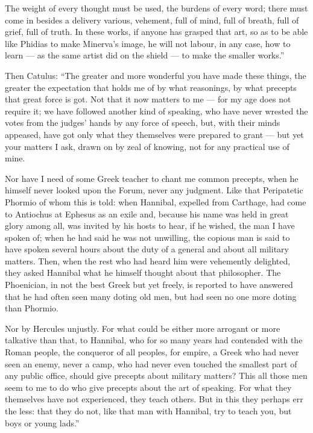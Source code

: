  The weight of every thought must be used, the burdens of every word; there must come in besides a delivery various, vehement, full of mind, full of breath, full of grief, full of truth. In these works, if anyone has grasped that art, so as to be able like Phidias to make Minerva's image, he will not labour, in any case, how to learn — as the same artist did on the shield — to make the smaller works.''

 Then Catulus: ``The greater and more wonderful you have made these things, the greater the expectation that holds me of by what reasonings, by what precepts that great force is got. Not that it now matters to me — for my age does not require it; we have followed another kind of speaking, who have never wrested the votes from the judges' hands by any force of speech, but, with their minds appeased, have got only what they themselves were prepared to grant — but yet your matters I ask, drawn on by zeal of knowing, not for any practical use of mine.

 Nor have I need of some Greek teacher to chant me common precepts, when he himself never looked upon the Forum, never any judgment. Like that Peripatetic Phormio of whom this is told: when Hannibal, expelled from Carthage, had come to Antiochus at Ephesus as an exile and, because his name was held in great glory among all, was invited by his hosts to hear, if he wished, the man I have spoken of; when he had said he was not unwilling, the copious man is said to have spoken several hours about the duty of a general and about all military matters. Then, when the rest who had heard him were vehemently delighted, they asked Hannibal what he himself thought about that philosopher. The Phoenician, in not the best Greek but yet freely, is reported to have answered that he had often seen many doting old men, but had seen no one more doting than Phormio.

 Nor by Hercules unjustly. For what could be either more arrogant or more talkative than that, to Hannibal, who for so many years had contended with the Roman people, the conqueror of all peoples, for empire, a Greek who had never seen an enemy, never a camp, who had never even touched the smallest part of any public office, should give precepts about military matters? This all those men seem to me to do who give precepts about the art of speaking. For what they themselves have not experienced, they teach others. But in this they perhaps err the less: that they do not, like that man with Hannibal, try to teach you, but boys or young lads.''

